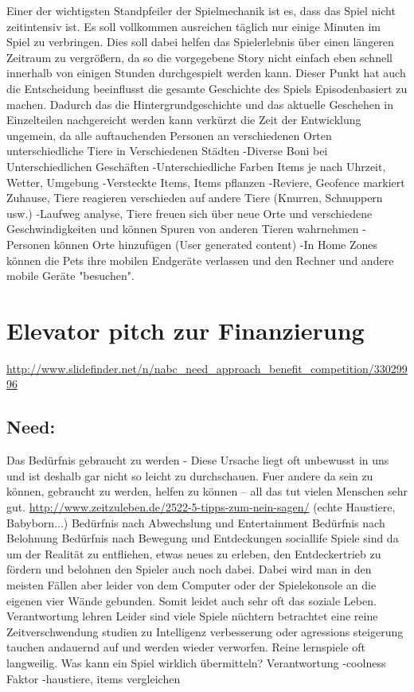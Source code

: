 Einer der wichtigsten Standpfeiler der Spielmechanik ist es, dass das Spiel nicht zeitintensiv ist. Es soll vollkommen ausreichen täglich nur einige Minuten im Spiel zu verbringen. Dies soll dabei helfen das Spielerlebnis über einen längeren Zeitraum zu vergrößern, da so die vorgegebene Story nicht einfach eben schnell innerhalb von einigen Stunden durchgespielt werden kann. Dieser Punkt hat auch die Entscheidung beeinflusst die gesamte Geschichte des Spiels Episodenbasiert zu machen.  Dadurch das die Hintergrundgeschichte und das aktuelle Geschehen in Einzelteilen nachgereicht werden kann verkürzt die Zeit der Entwicklung ungemein, da alle auftauchenden Personen
an verschiedenen Orten unterschiedliche Tiere in Verschiedenen Städten
-Diverse Boni bei Unterschiedlichen Geschäften
-Unterschiedliche Farben Items je nach Uhrzeit, Wetter, Umgebung
-Versteckte Items, Items pflanzen
-Reviere, Geofence markiert Zuhause, Tiere reagieren verschieden auf andere Tiere (Knurren, Schnuppern usw.)
-Laufweg analyse, Tiere freuen sich über neue Orte und verschiedene Geschwindigkeiten und können Spuren von anderen Tieren wahrnehmen
-Personen können Orte hinzufügen (User generated content)
-In Home Zones können die Pets ihre mobilen Endgeräte verlassen und den Rechner und andere mobile Geräte "besuchen".

\section{Elevator pitch zur Finanzierung}
\url{http://www.slidefinder.net/n/nabc_need_approach_benefit_competition/33029996}

\subsection{Need:}
Das Bedürfnis gebraucht zu werden - Diese Ursache liegt oft unbewusst in uns und ist deshalb gar nicht so leicht zu durchschauen. Fuer andere da sein zu können, gebraucht zu werden, helfen zu können – all das tut vielen Menschen sehr gut.
\url{http://www.zeitzuleben.de/2522-5-tipps-zum-nein-sagen/}
(echte Haustiere, Babyborn...)
Bedürfnis nach Abwechslung und Entertainment
Bedürfnis nach Belohnung
Bedürfnis nach Bewegung und Entdeckungen 
sociallife
Spiele sind da um der Realität zu entfliehen, etwas neues zu erleben,
den Entdeckertrieb zu fördern und belohnen den Spieler auch noch dabei.
Dabei wird man in den meisten Fällen aber leider von dem Computer oder der Spielekonsole an die eigenen vier Wände gebunden.
Somit leidet auch sehr oft das soziale Leben. 
Verantwortung lehren 
Leider sind viele Spiele nüchtern betrachtet eine reine Zeitverschwendung 
studien zu Intelligenz verbesserung oder agressions steigerung tauchen andauernd auf und werden wieder verworfen. 
Reine lernspiele oft langweilig. 
Was kann ein Spiel wirklich übermitteln?
Verantwortung 
-coolness Faktor 
-haustiere, items vergleichen 

